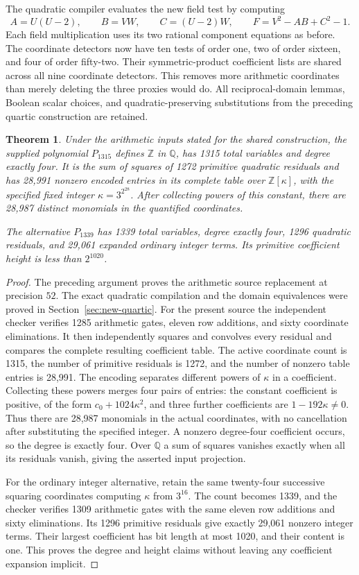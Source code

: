 \documentclass[11pt]{article}
\newtheorem{theorem}{Theorem}[section]
\theoremstyle{definition}
\begin{document}
The quadratic compiler evaluates the new field test by computing
\[
 A=U(U-2),\qquad B=VW,\qquad C=(U-2)W,
 \qquad F=V^2-AB+C^2-1.
\]
Each field multiplication uses its two rational component equations
as before. The coordinate detectors now have ten tests of order
one, two of order sixteen, and four of order fifty-two.
Their symmetric-product coefficient lists are shared across all
nine coordinate detectors. This removes more arithmetic
coordinates than merely deleting the three proxies would do.
All reciprocal-domain lemmas, Boolean scalar choices, and
quadratic-preserving substitutions from the preceding quartic
construction are retained.

\begin{theorem}\label{thm:p3-quartic1315}
Under the arithmetic inputs stated for the shared construction,
the supplied polynomial $P_{1315}$ defines $\mathbb Z$ in
$\mathbb Q$, has 1315 total variables and degree exactly four.
It is the sum of squares of 1272 primitive quadratic residuals
and has 28,991 nonzero encoded entries in its complete table over
$\mathbb Z[\kappa]$, with the specified fixed integer
$\kappa=3^{2^{28}}$. After collecting powers of this constant,
there are 28,987 distinct monomials in the quantified coordinates.

The alternative $P_{1339}$ has 1339 total variables, degree
exactly four, 1296 quadratic residuals, and 29,061 expanded
ordinary integer terms. Its primitive coefficient height is
less than $2^{1020}$.
\end{theorem}
\begin{proof}
The preceding argument proves the arithmetic source replacement
at precision $52$. The exact quadratic compilation and the
domain equivalences were proved in Section~\ref{sec:new-quartic}.
For the present source the independent checker verifies 1285
arithmetic gates, eleven row additions, and sixty coordinate
eliminations. It then independently squares and convolves every
residual and compares the complete resulting coefficient table.
The active coordinate count is 1315, the number of primitive
residuals is 1272, and the number of nonzero table entries is
28,991. The encoding separates different powers of $\kappa$
in a coefficient. Collecting these powers merges four pairs of
entries: the constant coefficient is positive, of the form
$c_0+1024\kappa^2$, and three further coefficients are
$1-192\kappa\ne0$. Thus there are 28,987 monomials in the
actual coordinates, with no cancellation after substituting the
specified integer. A nonzero degree-four coefficient occurs, so the degree
is exactly four. Over $\mathbb Q$ a sum of squares vanishes
exactly when all its residuals vanish, giving the asserted
input projection.

For the ordinary integer alternative, retain the same twenty-four
successive squaring coordinates computing $\kappa$ from $3^{16}$.
The count becomes 1339, and the checker verifies 1309 arithmetic
gates with the same eleven row additions and sixty eliminations.
Its 1296 primitive residuals give exactly 29,061 nonzero integer
terms. Their largest coefficient has bit length at most 1020,
and their content is one. This proves the degree and height
claims without leaving any coefficient expansion implicit.
\end{proof}
\end{document}
